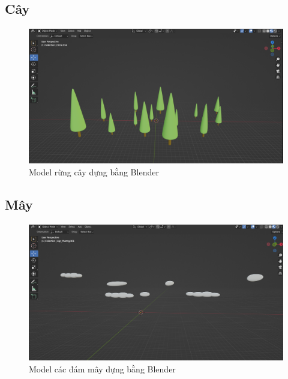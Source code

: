 \newpage
\subsection{Cây}
\begin{center}
    \begin{figure}[!h]
        \centering
        \includegraphics[scale = 0.35]{contents/tree.png}
        \caption{Model rừng cây dựng bằng Blender}
    \end{figure}
\end{center}


\subsection{Mây}
\begin{center}
    \begin{figure}[!h]
        \centering
        \includegraphics[scale = 0.35]{contents/cloud.png}
        \caption{Model các đám mây dựng bằng Blender}
    \end{figure}
\end{center}